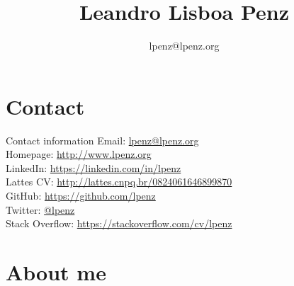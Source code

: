 \documentclass[ignorenonframetext]{beamer}
\title{Leandro Lisboa Penz}
\author{}
\date{lpenz@lpenz.org}
\begin{document}
\begin{frame}
    \maketitle
\end{frame}

\begin{frame}
    \tableofcontents
\end{frame}


\section{Contact}

\begin{frame}{Contact information}
    Email: \hfill \href{mailto:lpenz@lpenz.org}{lpenz@lpenz.org} \\

    Homepage: \hfill \url{http://www.lpenz.org} \\
    LinkedIn: \hfill \url{https://linkedin.com/in/lpenz} \\
    Lattes CV: \hfill \url{http://lattes.cnpq.br/0824061646899870} \\
    GitHub: \hfill \url{https://github.com/lpenz} \\
    Twitter: \hfill \href{https://twitter.com/lpenz}{@lpenz} \\
    Stack Overflow: \hfill \url{https://stackoverflow.com/cv/lpenz}
\end{frame}


\section{About me}
\end{document}
